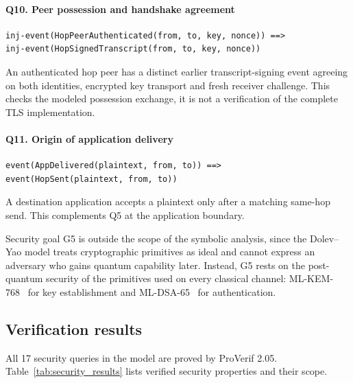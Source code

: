 \documentclass[futureinternet,article,submit,moreauthors]{Definitions/mdpi}
\begin{document}
\paragraph{Q10. Peer possession and handshake agreement}

\begin{lstlisting}
inj-event(HopPeerAuthenticated(from, to, key, nonce)) ==>
inj-event(HopSignedTranscript(from, to, key, nonce))
\end{lstlisting}

An authenticated hop peer has a distinct earlier transcript-signing event agreeing on both identities, encrypted key transport and fresh receiver challenge. This checks the modeled possession exchange, it is not a verification of the complete TLS implementation.

\paragraph{Q11. Origin of application delivery}

\begin{lstlisting}
event(AppDelivered(plaintext, from, to)) ==>
event(HopSent(plaintext, from, to))
\end{lstlisting}

A destination application accepts a plaintext only after a matching same-hop send. This complements Q5 at the application boundary.

Security goal G5 is outside the scope of the symbolic analysis, since the Dolev--Yao model treats cryptographic primitives as ideal and cannot express an adversary who gains quantum capability later. Instead, G5 rests on the post-quantum security of the primitives used on every classical channel: ML-KEM-768~\cite{noauthor_module-lattice-based_2024} for key establishment and ML-DSA-65~\cite{noauthor_module-lattice-based_2024-1} for authentication.

\subsection{Verification results}

All 17 security queries in the model are proved by ProVerif 2.05. Table~\ref{tab:security_results} lists verified security properties and their scope.
\end{document}
